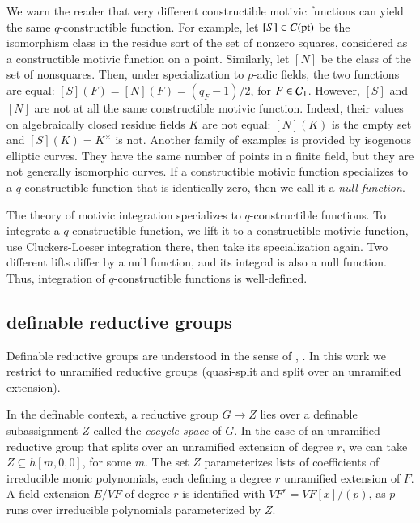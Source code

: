 We warn the reader that very different constructible motivic functions
can yield the same $q$-constructible function.  For example, let
$[S]\in C({\operatorname{pt}})$ be the isomorphism class in the residue sort of
the set of nonzero squares, considered as a constructible motivic
function on a point.  Similarly, let $[N]$ be the class of the set of
nonsquares.  Then, under specialization to $p$-adic fields, the two
functions are equal: $[S](F) = [N](F) = (q_F-1)/2$, for
$F\in\mathcal C_1$. However, $[S]$ and $[N]$ are not at all the same
constructible motivic function. Indeed, their values on algebraically
closed residue fields $K$ are not equal: $[N](K)$ is the empty set and
$[S](K) = K^\times$ is not.  Another family of examples is provided by
isogenous elliptic curves.  They have the same number of points in a
finite field, but they are not generally isomorphic curves.  If a
constructible motivic function specializes to a $q$-constructible
function that is identically zero, then we call it a {\it null function}.

The theory of motivic integration specializes to $q$-constructible
functions. To integrate a $q$-constructible function, we lift it
to a constructible motivic function, use Cluckers-Loeser integration
there, then take its specialization again.  Two different lifts differ
by a null function, and its integral is also a null function.
Thus, integration of $q$-constructible functions is well-defined.

\subsection{definable reductive groups}\label{sec:defred}

Definable reductive groups are understood in the sense of
\cite{cluckers2011transfer}, \cite{gordon}.  In this work we restrict
to unramified reductive groups (quasi-split and split over an
unramified extension).

In the definable context, a reductive group $G\to Z$ lies over a
definable subassignment $Z$ called the {\it cocycle space} of $G$.  In
the case of an unramified reductive group that splits over an
unramified extension of degree $r$, we can take $Z\subseteq h[m,0,0]$,
for some $m$.  The set $Z$ parameterizes lists of coefficients of
irreducible monic polynomials, each defining a degree $r$ unramified
extension of $F$.  A field extension $E/VF$ of degree $r$ is
identified with $VF^r = VF[x]/(p)$, as $p$ runs over irreducible
polynomials parameterized by $Z$.

